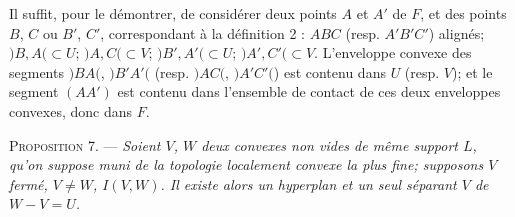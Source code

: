 \documentclass[11pt]{article}
\newcommand{\bzcf}[2]{#1}
\newenvironment{prop}[1][]{\par\medskip\noindent\textsc{Proposition #1.} --- \itshape}{\par\medskip}
\newenvironment{proof}[1][]{\par}{\par}
\begin{document}
\begin{proof}
Il suffit, pour le démontrer, de considérer deux points $A$ et $A'$ de $F$, et des points $B$, $C$
ou $B'$, $C'$, correspondant à \bzcf{la définition 2}{\ref{bzdef:c3s5d2_ensemble_contact}} :
$ABC$ (resp. $A'B'C'$) alignés; $)B, A(\subset U$; $)A, C(\subset V$; $)B', A'(\subset U$;
$)A', C'(\subset V$. L'enveloppe convexe des segments $)BA($, $)B'A'($ (resp. $)AC($,
$)A'C'($) est contenu dans $U$ (resp. $V$); et le segment $(AA')$ est contenu dans l'ensemble de
contact de ces deux enveloppes convexes, donc dans $F$.
\end{proof}

\begin{prop}[7]
Soient $V$, $W$ deux convexes non vides de même support $L$, qu'on suppose muni de la topologie
localement convexe la plus fine; supposons $V$ fermé, $V\neq W$, $I(V, W)$. Il existe alors un
hyperplan et un seul séparant $V$ de $W-V=U$.
\end{prop}
\end{document}
